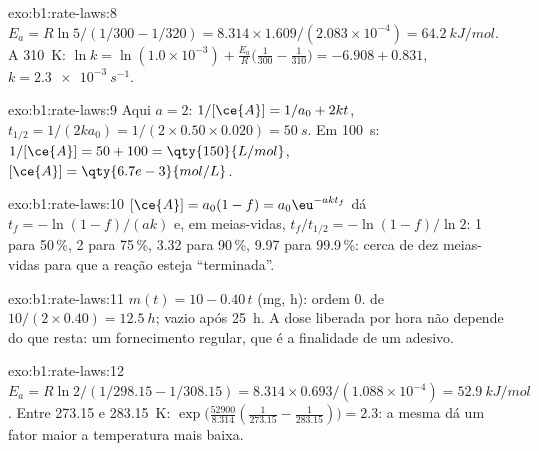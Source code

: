 \begin{solution}{exo:b1:rate-laws:8}
$E_a = R\ln5/(1/300 - 1/320) = 8.314 \times 1.609/(2.083 \times 10^{-4}) =
\qty{64.2}{kJ/mol}$. A \qty{310}{K}: $\ln k = \ln(1.0 \times 10^{-3}) +
\frac{E_a}{R}\big(\frac{1}{300} - \frac{1}{310}\big) = -6.908 + 0.831$,
$k = \qty{2.3e-3}{s^{-1}}$.
\end{solution}

\begin{solution}{exo:b1:rate-laws:9}
Aqui $a = 2$: $1/[\ce{A}] = 1/a_0 + 2kt$, $t_{1/2} = 1/(2k a_0) = 1/(2
\times 0.50 \times 0.020) = \qty{50}{s}$. Em \qty{100}{s}: $1/[\ce{A}] = 50
+ 100 = \qty{150}{L/mol}$, $[\ce{A}] = \qty{6.7e-3}{mol/L}$.
\end{solution}

\begin{solution}{exo:b1:rate-laws:10}
$[\ce{A}] = a_0(1 - f) = a_0\eu^{-akt_f}$ dá $t_f = -\ln(1-f)/(ak)$ e,
em meias-vidas, $t_f/t_{1/2} = -\ln(1-f)/\ln2$: 1 para 50\,\%, 2 para 75\,\%,
3.32 para 90\,\%, 9.97 para 99.9\,\%: cerca de dez meias-vidas para que a
reação esteja ``terminada''.
\end{solution}

\begin{solution}{exo:b1:rate-laws:11}
$m(t) = 10 - 0.40\,t$ (\unit{mg}, \unit{h}): ordem 0.  de
$10/(2 \times 0.40) = \qty{12.5}{h}$; vazio após \qty{25}{h}. A dose
liberada por hora não depende do que resta: um fornecimento regular,
que é a finalidade de um adesivo.
\end{solution}

\begin{solution}{exo:b1:rate-laws:12}
$E_a = R\ln2/(1/298.15 - 1/308.15) = 8.314 \times 0.693/(1.088 \times
10^{-4}) = \qty{52.9}{kJ/mol}$. Entre 273.15 e \qty{283.15}{K}:
$\exp\big(\frac{52900}{8.314}(\frac{1}{273.15} - \frac{1}{283.15})\big) =
2.3$: a mesma  dá um fator maior a temperatura mais
baixa.
\end{solution}


